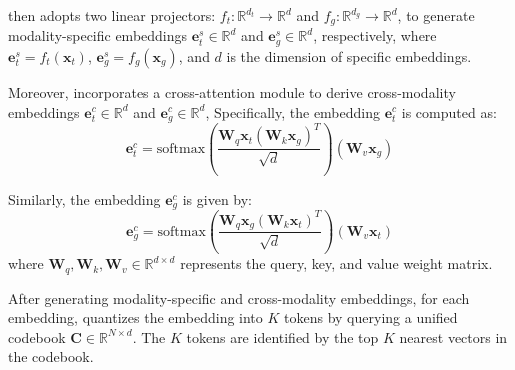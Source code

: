  \model then adopts two linear projectors: $f_t : \mathbb{R}^{d_t} \rightarrow \mathbb{R}^{d}$ and $f_{g} : \mathbb{R}^{d_g} \rightarrow \mathbb{R}^{d}$, to generate modality-specific embeddings $\mathbf{e}_{t}^{s} \in \mathbb{R}^{d}$ and $\mathbf{e}_{g}^{s} \in \mathbb{R}^{d}$, respectively, where $\mathbf{e}_{t}^{s} = f_t(\mathbf{x}_{t})$, $\mathbf{e}_{g}^{s} = f_g(\mathbf{x}_{g})$, and $d$ is the dimension of specific embeddings.

Moreover, \model incorporates a cross-attention module to derive cross-modality embeddings $\mathbf{e}_{t}^{c} \in \mathbb{R}^{d}$ and $\mathbf{e}_{g}^{c} \in \mathbb{R}^{d}$, Specifically, the embedding $\mathbf{e}_{t}^{c}$ is computed as:
\begin{equation}
\mathbf{e}_{t}^{c} = \mathrm{softmax} \left( \frac{\mathbf{W}_q \mathbf{x}_{t} (\mathbf{W}_{k} \mathbf{x}_{g})^{T}}{\sqrt{d}} \right) (\mathbf{W}_{v} \mathbf{x}_{g})
\end{equation}

Similarly, the embedding $\mathbf{e}_{g}^{c}$ is given by:
\begin{equation}
\mathbf{e}_{g}^{c} = \mathrm{softmax} \left( \frac{\mathbf{W}_q \mathbf{x}_{g} (\mathbf{W}_{k} \mathbf{x}_{t})^{T}}{\sqrt{d}} \right) (\mathbf{W}_{v} \mathbf{x}_{t})
\end{equation}
where $\mathbf{W}_q, \mathbf{W}_k, \mathbf{W}_v \in \mathbb{R}^{d \times d}$ represents the query, key, and value weight matrix.

After generating modality-specific and cross-modality embeddings, for each embedding, \model quantizes the embedding into $K$ tokens by querying a unified codebook $\mathbf{C} \in \mathbb{R}^{N \times d}$. The $K$ tokens are identified by the top $K$ nearest vectors in the codebook. 

